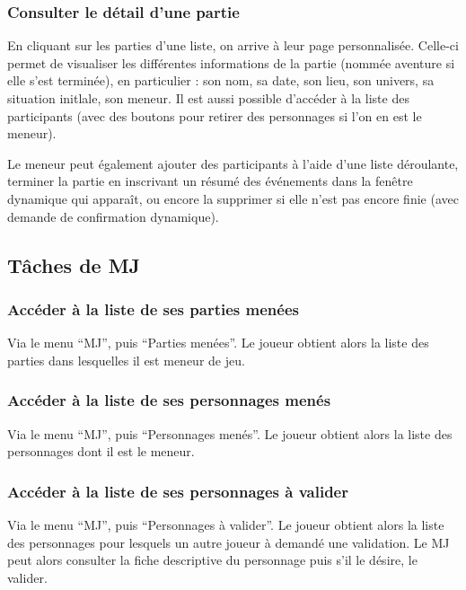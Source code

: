 \documentclass[a4paper, 11pt, titlepage]{article}
\begin{document}
\subsubsection {Consulter le détail d'une partie}

En cliquant sur les parties d'une liste, on arrive à leur page personnalisée. Celle-ci permet de visualiser les différentes informations de la partie (nommée aventure si elle s'est terminée), en particulier : son nom, sa date, son lieu, son univers, sa situation initlale, son meneur. Il est aussi possible d'accéder à la liste des participants (avec des boutons pour retirer des personnages si l'on en est le meneur).

Le meneur peut également ajouter des participants à l'aide d'une liste déroulante, terminer la partie en inscrivant un résumé des événements dans la fenêtre dynamique qui apparaît, ou encore la supprimer si elle n'est pas encore finie (avec demande de confirmation dynamique).


\subsection {Tâches de MJ}

\subsubsection {Accéder à la liste de ses parties menées}

Via le menu “MJ”, puis “Parties menées”. Le joueur obtient alors la liste des parties dans lesquelles il est meneur de jeu.

\subsubsection {Accéder à la liste de ses personnages menés}

Via le menu “MJ”, puis “Personnages menés”. Le joueur obtient alors la liste des personnages dont il est le meneur.

\subsubsection {Accéder à la liste de ses personnages à valider}

Via le menu “MJ”, puis “Personnages à valider”. Le joueur obtient alors la liste des personnages pour lesquels un autre joueur à demandé une validation. Le MJ peut alors consulter la fiche descriptive du personnage puis s’il le désire, le valider.
\end{document}
